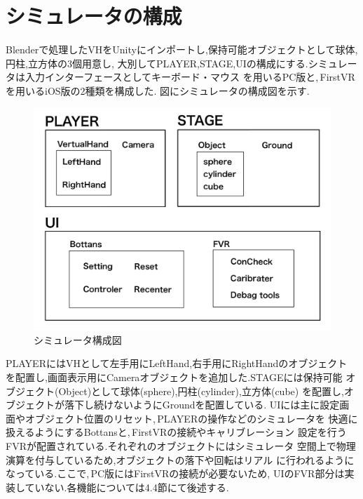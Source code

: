 \documentclass{ltjsreport}
\begin{document}
	\section{シミュレータの構成}
		Blenderで処理したVHをUnityにインポートし,保持可能オブジェクトとして球体,円柱,立方体の3個用意し,
		大別してPLAYER,STAGE,UIの構成にする.シミュレータは入力インターフェースとしてキーボード・マウス
		を用いるPC版と,\,FirstVRを用いるiOS版の2種類を構成した.
		図にシミュレータの構成図を示す.

		\begin{figure}[H]
		\centering
		\includegraphics[width = 12cm]{../figs/IMG_0340.JPG}
		\caption{シミュレータ構成図}
		\label{fig:simuraterconst}
		\end{figure}
		\vspace{-15pt}
		PLAYERにはVHとして左手用にLeftHand,右手用にRightHandのオブジェクト
		を配置し,画面表示用にCameraオブジェクトを追加した.STAGEには保持可能
		オブジェクト(Object)として球体(sphere),円柱(cylinder),立方体(cube)
		を配置し,オブジェクトが落下し続けないようにGroundを配置している.
		UIには主に設定画面やオブジェクト位置のリセット,\,PLAYERの操作などのシミュレータを
		快適に扱えるようにするBottansと,\,FirstVRの接続やキャリブレーション
		設定を行うFVRが配置されている.それぞれのオブジェクトにはシミュレータ
		空間上で物理演算を付与しているため,オブジェクトの落下や回転はリアル
		に行われるようになっている.ここで,\,PC版にはFirstVRの接続が必要ないため,
		UIのFVR部分は実装していない.各機能については4.4節にて後述する.
\end{document}
